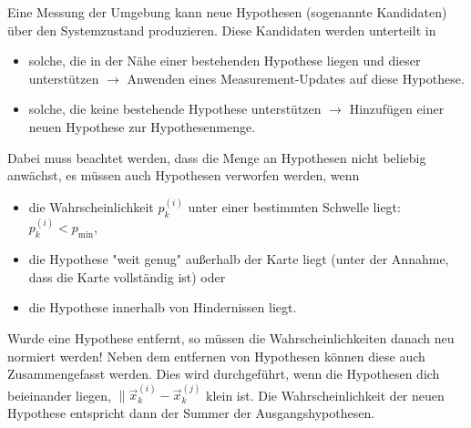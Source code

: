 					Eine Messung der Umgebung kann neue Hypothesen (sogenannte Kandidaten) über den Systemzustand produzieren. Diese Kandidaten werden unterteilt in
					\begin{itemize}
						\item solche, die in der Nähe einer bestehenden Hypothese liegen und dieser unterstützen \( \to \) Anwenden eines Measurement-Updates auf diese Hypothese.
						\item solche, die keine bestehende Hypothese unterstützen \( \to \) Hinzufügen einer neuen Hypothese zur Hypothesenmenge.
					\end{itemize}
					Dabei muss beachtet werden, dass die Menge an Hypothesen nicht beliebig anwächst, \dh es müssen auch Hypothesen verworfen werden, \zB wenn
					\begin{itemize}
						\item die Wahrscheinlichkeit \( p_k^{(i)} \) unter einer bestimmten Schwelle liegt: \( p_k^{(i)} < p_\text{min} \),
						\item die Hypothese "weit genug" außerhalb der Karte liegt (unter der Annahme, dass die Karte vollständig ist) oder
						\item die Hypothese innerhalb von Hindernissen liegt.
					\end{itemize}
					Wurde eine Hypothese entfernt, so müssen die Wahrscheinlichkeiten danach neu normiert werden! Neben dem entfernen von Hypothesen können diese auch Zusammengefasst werden. Dies wird durchgeführt, wenn die Hypothesen dich beieinander liegen, \dh \( \big\lVert \vec{x}_k^{(i)} - \vec{x}_k^{(j)} \) klein ist. Die Wahrscheinlichkeit der neuen Hypothese entspricht dann der Summer der Ausgangshypothesen.

